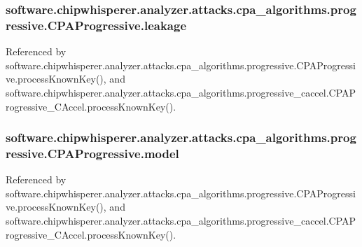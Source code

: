 \subsubsection[{leakage}]{\setlength{\rightskip}{0pt plus 5cm}software.\+chipwhisperer.\+analyzer.\+attacks.\+cpa\+\_\+algorithms.\+progressive.\+C\+P\+A\+Progressive.\+leakage}\label{classsoftware_1_1chipwhisperer_1_1analyzer_1_1attacks_1_1cpa__algorithms_1_1progressive_1_1CPAProgressive_adfd506df2b2c62432135051e58d8e355}


Referenced by software.\+chipwhisperer.\+analyzer.\+attacks.\+cpa\+\_\+algorithms.\+progressive.\+C\+P\+A\+Progressive.\+process\+Known\+Key(), and software.\+chipwhisperer.\+analyzer.\+attacks.\+cpa\+\_\+algorithms.\+progressive\+\_\+caccel.\+C\+P\+A\+Progressive\+\_\+\+C\+Accel.\+process\+Known\+Key().

\hypertarget{classsoftware_1_1chipwhisperer_1_1analyzer_1_1attacks_1_1cpa__algorithms_1_1progressive_1_1CPAProgressive_a2900a6e0d49d49ad4d1587ef80970af3}{}
\subsubsection[{model}]{\setlength{\rightskip}{0pt plus 5cm}software.\+chipwhisperer.\+analyzer.\+attacks.\+cpa\+\_\+algorithms.\+progressive.\+C\+P\+A\+Progressive.\+model}\label{classsoftware_1_1chipwhisperer_1_1analyzer_1_1attacks_1_1cpa__algorithms_1_1progressive_1_1CPAProgressive_a2900a6e0d49d49ad4d1587ef80970af3}


Referenced by software.\+chipwhisperer.\+analyzer.\+attacks.\+cpa\+\_\+algorithms.\+progressive.\+C\+P\+A\+Progressive.\+process\+Known\+Key(), and software.\+chipwhisperer.\+analyzer.\+attacks.\+cpa\+\_\+algorithms.\+progressive\+\_\+caccel.\+C\+P\+A\+Progressive\+\_\+\+C\+Accel.\+process\+Known\+Key().

\hypertarget{classsoftware_1_1chipwhisperer_1_1analyzer_1_1attacks_1_1cpa__algorithms_1_1progressive_1_1CPAProgressive_a106dc20059379dba40e4ef321ae35fd4}{}
